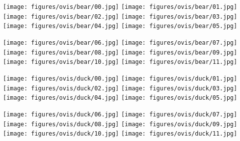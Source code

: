 \documentclass[10pt,twocolumn,letterpaper]{article}
\begin{document}
\begin{figure*}[t]

\begin{minipage}[c]{1.00\linewidth}
\texttt{[image: figures/ovis/bear/00.jpg]}
\texttt{[image: figures/ovis/bear/01.jpg]}
\texttt{[image: figures/ovis/bear/02.jpg]}
\texttt{[image: figures/ovis/bear/03.jpg]}
\texttt{[image: figures/ovis/bear/04.jpg]}
\texttt{[image: figures/ovis/bear/05.jpg]}
\end{minipage}\hfill
\begin{minipage}[c]{1.0\linewidth}
\texttt{[image: figures/ovis/bear/06.jpg]}
\texttt{[image: figures/ovis/bear/07.jpg]}
\texttt{[image: figures/ovis/bear/08.jpg]}
\texttt{[image: figures/ovis/bear/09.jpg]}
\texttt{[image: figures/ovis/bear/10.jpg]}
\texttt{[image: figures/ovis/bear/11.jpg]}
\end{minipage}\hfill\vspace{1mm}

\begin{minipage}[c]{1.00\linewidth}
\texttt{[image: figures/ovis/duck/00.jpg]}
\texttt{[image: figures/ovis/duck/01.jpg]}
\texttt{[image: figures/ovis/duck/02.jpg]}
\texttt{[image: figures/ovis/duck/03.jpg]}
\texttt{[image: figures/ovis/duck/04.jpg]}
\texttt{[image: figures/ovis/duck/05.jpg]}
\end{minipage}\hfill
\begin{minipage}[c]{1.0\linewidth}
\texttt{[image: figures/ovis/duck/06.jpg]}
\texttt{[image: figures/ovis/duck/07.jpg]}
\texttt{[image: figures/ovis/duck/08.jpg]}
\texttt{[image: figures/ovis/duck/09.jpg]}
\texttt{[image: figures/ovis/duck/10.jpg]}
\texttt{[image: figures/ovis/duck/11.jpg]}
\end{minipage}\hfill\vspace{1mm}


\end{figure*}
\end{document}

